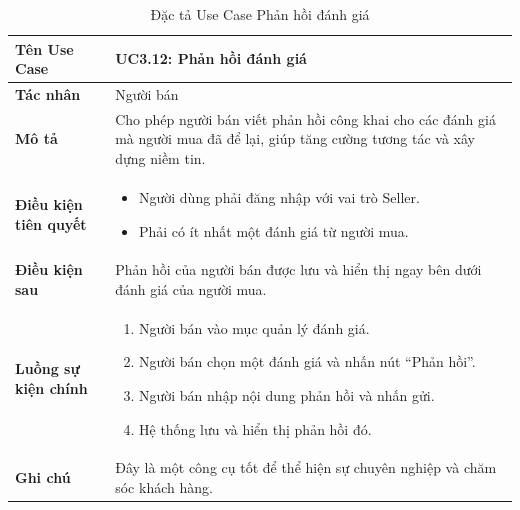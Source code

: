 \begin{table}[H]
\centering
\begin{tabularx}{\textwidth}{|l|X|}
\hline
\textbf{Tên Use Case} & \textbf{UC3.12: Phản hồi đánh giá} \\ \hline
\textbf{Tác nhân} & Người bán \\ \hline
\textbf{Mô tả} & Cho phép người bán viết phản hồi công khai cho các đánh giá mà người mua đã để lại, giúp tăng cường tương tác và xây dựng niềm tin. \\ \hline
\textbf{Điều kiện tiên quyết} & 
\begin{itemize}
    \item Người dùng phải đăng nhập với vai trò Seller.
    \item Phải có ít nhất một đánh giá từ người mua.
\end{itemize} \\ \hline
\textbf{Điều kiện sau} & Phản hồi của người bán được lưu và hiển thị ngay bên dưới đánh giá của người mua. \\ \hline
\textbf{Luồng sự kiện chính} & 
\begin{enumerate}
    \item Người bán vào mục quản lý đánh giá.
    \item Người bán chọn một đánh giá và nhấn nút ``Phản hồi''.
    \item Người bán nhập nội dung phản hồi và nhấn gửi.
    \item Hệ thống lưu và hiển thị phản hồi đó.
\end{enumerate} \\ \hline
\textbf{Ghi chú} & Đây là một công cụ tốt để thể hiện sự chuyên nghiệp và chăm sóc khách hàng. \\ \hline
\end{tabularx}
\caption{Đặc tả Use Case Phản hồi đánh giá}
\end{table}